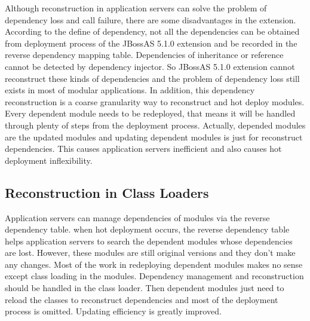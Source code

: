 \documentclass[conference]{IEEEtran}
\begin{document}
Although reconstruction in application servers can solve the problem of dependency loss and call failure, there are some disadvantages in the extension.
According to the define of dependency, not all the dependencies can be obtained from deployment process of the JBossAS 5.1.0 extension and be recorded in the reverse dependency mapping table.
Dependencies of inheritance or reference cannot be detected by dependency injector.
So JBossAS 5.1.0 extension cannot reconstruct these kinds of dependencies and the problem of dependency loss still exists in most of modular applications.
In addition, this dependency reconstruction is a coarse granularity way to reconstruct and hot deploy modules.
Every dependent module needs to be redeployed, that means it will be handled through plenty of steps from the deployment process.
Actually, depended modules are the updated modules and updating dependent modules is just for reconstruct dependencies.
This causes application servers inefficient and also causes hot deployment inflexibility.

 
\subsection{Reconstruction in Class Loaders}
Application servers can manage dependencies of modules via the reverse dependency table.
when hot deployment occurs, the reverse dependency table helps application servers to search the dependent modules whose dependencies are lost.
However, these modules are still original versions and they don't make any changes.
Most of the work in redeploying dependent modules makes no sense except class loading in the modules.
Dependency management and reconstruction should be handled in the class loader.
Then dependent modules just need to reload the classes to reconstruct dependencies and most of the deployment process is omitted.
Updating efficiency is greatly improved.
\end{document}
